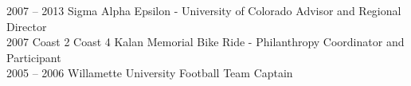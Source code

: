 2007 -- 2013 \hspace{26pt} Sigma Alpha Epsilon \-- University of Colorado Advisor and Regional Director \\
2007 \hspace{58pt} Coast 2 Coast 4 Kalan Memorial Bike Ride \-- Philanthropy Coordinator and Participant \\
2005 -- 2006 \hspace{26pt} Willamette University Football Team Captain \\
\\